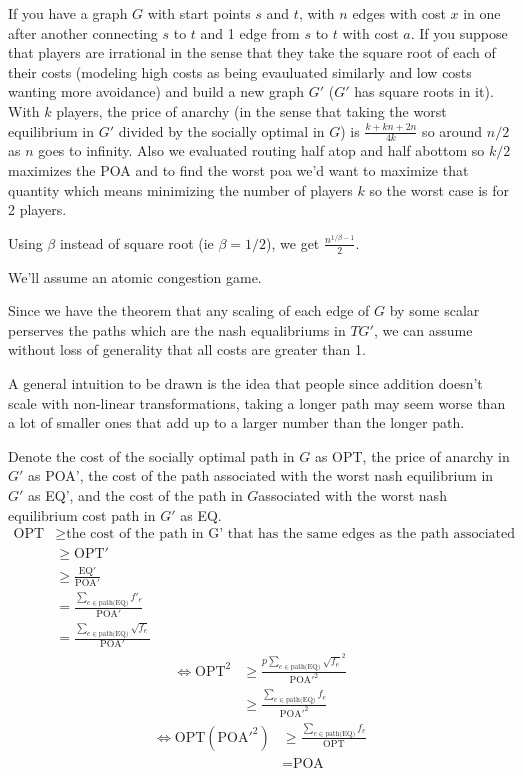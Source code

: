 \documentclass[11pt]{article}
\begin{document}
If you have a graph $G$ with start points $s$ and $t$, with $n$ edges with cost $x$ in one after another connecting $s$ to $t$ and 1 edge from $s$ to $t$ with cost $a$.  If you suppose that players are irrational in the sense that they take the square root of each of their costs (modeling high costs as being evauluated similarly and low costs wanting more avoidance) and build a new graph $G'$ ($G'$ has square roots in it).  With $k$ players, the price of anarchy (in the sense that taking the worst equilibrium in $G'$ divided by the socially optimal in $G$) is $\frac{k + kn + 2n}{4k}$ so around $n/2$ as $n$ goes to infinity.  Also we evaluated routing half atop and half abottom so $k/2$ maximizes the POA and to find the worst poa we'd want to maximize that quantity which means minimizing the number of players $k$ so the worst case is for 2 players.

Using $\beta$ instead of square root (ie $\beta = 1/2$), we get $\frac{n^{1/\beta - 1}}{2}$.

We'll assume an atomic congestion game. 

Since we have the theorem that any scaling of each edge of $G$ by some scalar perserves the paths which are the nash equalibriums in $TG'$, we can assume without loss of generality that all costs are greater than 1.

A general intuition to be drawn is the idea that people since addition doesn't scale with non-linear transformations, taking a longer path may seem worse than a lot of smaller ones that add up to a larger number than the longer path.

Denote the cost of the socially optimal path in $G$ as OPT, the price of anarchy in $G'$ as POA', the cost of the path associated with the worst nash equilibrium in $G'$ as EQ', and the cost of the path in $G$associated with the worst nash equilibrium cost path in $G'$ as EQ.
\begin{align*}
\text{OPT} &\ge \text{the cost of the path in G' that has the same edges as the path associated with OPT} \\
&\ge \text{OPT}' \\
&\ge \frac{\text{EQ}'}{\text{POA}'} \\
&= \frac{\sum\limits_{e \in \text{path(EQ)}} f'_e}{\text{POA}'} \\
&= \frac{\sum\limits_{e \in \text{path(EQ)}} \sqrt{f_e}}{\text{POA}'}
\end{align*}
\begin{align*}
\iff \text{OPT}^2 &\ge \frac{p{\sum\limits_{e \in \text{path(EQ)}} \sqrt{f_e}}^2}{\text{POA}'^2} \\
&\ge \frac{\sum\limits_{e \in \text{path(EQ)}} f_e }{\text{POA}'^2}
\end{align*}
\begin{align*}
\iff \text{OPT}(\text{POA}'^2) &\ge \frac{\sum\limits_{e \in \text{path(EQ)}} f_e }{\text{OPT}} \\
&= \text{POA}
\end{align*}
\end{document}
